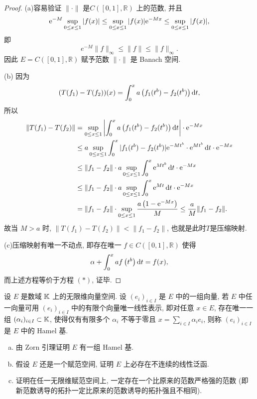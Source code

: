 \begin{proof}
(a)容易验证 $\|\cdot\|$ 是$C([0,1],\mathbb{R})$ 上的范数, 并且
\[\mathrm{e}^{-M}\sup\limits_{0\leq x\leq1}|f(x)|\leq\sup\limits_{0\leq x\leq1}|f(x)|\mathrm{e}^{-Mx}\leq\sup\limits_{0\leq x\leq1}|f(x)|,\]
即
\[e^{-M}\|f\|_{\infty}\leq\|f\|\leq\|f\|_{\infty}.\]
因此 $E=C([0,1],\mathbb{R})$ 赋予范数 $\|\cdot\|$ 是 Banach 空间.

(b) 因为
\[(T(f_1)-T(f_2))(x)=\int_0^xa\left(f_1(t^b)-f_2(t^b)\right)\mathop{}\!\mathrm{d} t,\]
所以
\begin{align*}
    \|T(f_1)-T(f_2)\| & =\sup\limits_{0\leq x\leq 1}\left|\int_0^x a\left(f_1(t^b)-f_2(t^b)\right)\mathop{}\!\mathrm{d} t\right|\cdot \mathrm{e}^{-Mx}\\
                      & \leq a\sup\limits_{0\leq x\leq 1}\int_0^x|f_1(t^b)-f_2(t^b)|\mathrm{e}^{-Mt^b}\cdot \mathrm{e}^{Mt^b}\mathop{}\!\mathrm{d} t\cdot \mathrm{e}^{-Mx}\\
                      & \leq\|f_1-f_2\|\cdot a\sup\limits_{0\leq x\leq 1}\int_0^x \mathrm{e}^{Mt^b}\mathop{}\!\mathrm{d} t\cdot \mathrm{e}^{-Mx}\\
                      & \leq\|f_1-f_2\|\cdot a\sup\limits_{0\leq x\leq 1}\int_0^x \mathrm{e}^{Mt}\mathop{}\!\mathrm{d} t\cdot \mathrm{e}^{-Mx}\\
                      & =\|f_1-f_2\|\cdot\sup\limits_{0\leq x\leq 1}\frac{a\left(1-\mathrm{e}^{-Mx}\right)}{M}\leq\frac{a}{M}\|f_1-f_2\|.
\end{align*}
故当 $M>a$ 时, $\|T(f_1)-T(f_2)\|<\|f_1-f_2\|$, 也就是此时$T$是压缩映射.

(c)压缩映射有唯一不动点, 即存在唯一 $f\in C([0,1],\mathbb{R})$ 使得
\[\alpha+\int_0^xaf\left(t^b\right)\mathop{}\!\mathrm{d} t=f(x),\]
而上述方程等价于方程 $(*)$, 证毕.
\end{proof}


\begin{exercise}
    设 $E$ 是数域 $\mathbb{K}$ 上的无限维向量空间. 设 $(e_i)_{i\in I}$
    是 $E$ 中的一组向量, 若 $E$ 中任一向量可用 $(e_i)_{i\in I}$
    中的有限个向量唯一线性表示, 即对任意 $x\in E$, 存在唯一一组 $(\alpha_i)_{i\in I}\subset\mathbb{K}$,
    使得仅有有限多个 $\alpha_i$ 不等于零且 $x=\sum_{i\in I}\alpha_ie_i$,
    则称 $(e_i)_{i\in I}$ 是 $E$ 中的 Hamel 基.
    \begin{enumerate}[(a)]
        \item 由 Zorn 引理证明 $E$ 有一组 Hamel 基.
        \item 假设 $E$ 还是一个赋范空间, 证明 $E$ 上必存在不连续的线性泛函.
        \item 证明在任一无限维赋范空间上, 一定存在一个比原来的范数严格强的范数
              (即新范数诱导的拓扑一定比原来的范数诱导的拓扑强且不相同).
    \end{enumerate}
\end{exercise}

